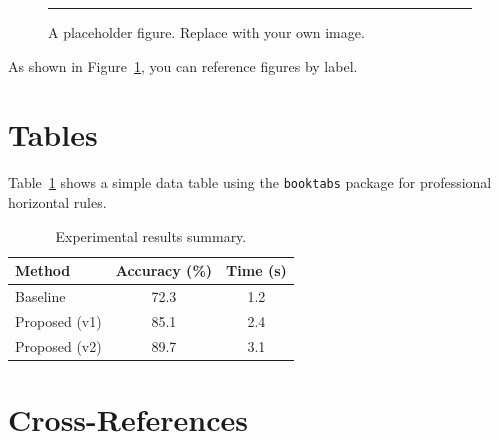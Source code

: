 \documentclass[12pt, a4paper]{article}
\begin{document}

\begin{figure}[htbp]          %
    \centering
    \rule{0.6\textwidth}{4cm}  %
    \caption{A placeholder figure. Replace with your own image.}
    \label{fig:placeholder}
\end{figure}

As shown in Figure~\ref{fig:placeholder}, you can reference figures by label.

\section{Tables}
\label{sec:tables}

Table~\ref{tab:example} shows a simple data table using the \texttt{booktabs}
package for professional horizontal rules.

\begin{table}[htbp]
    \centering
    \caption{Experimental results summary.}
    \label{tab:example}
    \begin{tabular}{lcc}
        \toprule
        \textbf{Method} & \textbf{Accuracy (\%)} & \textbf{Time (s)} \\
        \midrule
        Baseline         & 72.3  & 1.2 \\
        Proposed (v1)    & 85.1  & 2.4 \\
        Proposed (v2)    & 89.7  & 3.1 \\
        \bottomrule
    \end{tabular}
\end{table}

\section{Cross-References}
\label{sec:crossref}
\end{document}
